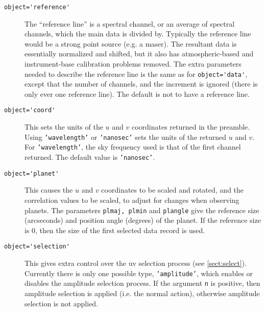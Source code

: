 \begin{description}
\item[\verb+object='reference'+] The ``reference line'' is a spectral channel,
or an average of spectral channels, which the main data is divided by. Typically
the reference line would be a strong point source (e.g. a maser). The resultant
data is essentially normalized and shifted, but it also has atmospheric-based
and instrument-base calibration problems removed. The extra parameters needed
to describe the reference line is the same as for \verb+object='data'+, except
that the number of channels, and the increment is ignored (there is only ever
one reference line). The default is not to have a reference line.
\item[\verb+object='coord'+] This sets the
units of the $u$ and $v$ coordinates returned in the preamble. Using
{\tt 'wavelength'} or {\tt 'nanosec'} sets the units of the returned $u$
and $v$. For {\tt 'wavelength'}, the sky frequency used is that of the first
channel returned. The default value is {\tt 'nanosec'}.
\item[\verb+object='planet'+] This causes 
the $u$ and $v$ coordinates to be scaled and rotated, and the correlation
values to be scaled,
to adjust for changes when observing planets.
The parameters {\tt plmaj, plmin} and {\tt plangle} give the reference
size (arcseconds) and position angle (degrees) of the planet. If the reference
size is 0, then the size of the first selected data record is used.
\item[\verb+object='selection'+] This gives extra control over the uv
selection process (see \ref{sect:select}). Currently there is only
one possible type, {\tt 'amplitude'}, which enables or disables the
amplitude selection process. If the argument {\tt n} is positive, then
amplitude selection is applied (i.e. the normal action), otherwise
amplitude selection is not applied.
\end{description}

